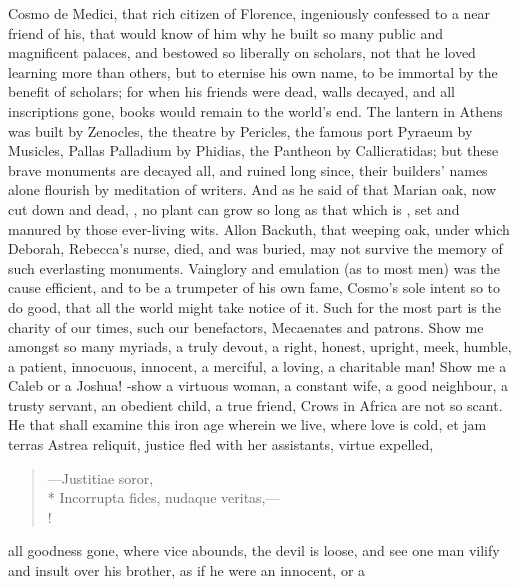 {\textlatin{Cosmo de Medici}, that rich citizen of Florence, ingeniously
confessed to a near friend of his, that would know of him why he built
so many public and magnificent palaces, and bestowed so liberally on
scholars, not that he loved learning more than others, but to
eternise his own name, to be immortal by the benefit of scholars;
for when his friends were dead, walls decayed, and all inscriptions
gone, books would remain to the world's end. The lantern in
Athens was built by Zenocles, the theatre by Pericles, the famous
port Pyraeum by Musicles, Pallas Palladium by Phidias, the Pantheon by
Callicratidas; but these brave monuments are decayed all, and ruined
long since, their builders' names alone flourish by meditation of
writers. And as he said of that Marian oak, now cut down and
dead, , no plant can grow so long as that which
is , set and manured by those ever-living wits. Allon
Backuth, that weeping oak, under which Deborah, Rebecca's nurse, died,
and was buried, may not survive the memory of such everlasting
monuments. Vainglory and emulation (as to most men) was the cause
efficient, and to be a trumpeter of his own fame, Cosmo's sole intent
so to do good, that all the world might take notice of it. Such for the
most part is the charity of our times, such our benefactors, Mecaenates
and patrons. Show me amongst so many myriads, a truly devout, a right,
honest, upright, meek, humble, a patient, innocuous, innocent, a
merciful, a loving, a charitable man! 
Show me a Caleb or a Joshua! -show a virtuous woman,
a constant wife, a good neighbour, a trusty servant, an obedient child,
a true friend, \etc{} Crows in Africa are not so scant. He that shall
examine this iron age wherein we live, where love is cold, et jam
terras Astrea reliquit, justice fled with her assistants, virtue
expelled,
%
\begin{latin}
\begin{verse}
---Justitiae soror,\\*
Incorrupta fides, nudaque veritas,---\\!
\end{verse}
\end{latin}
%
all goodness gone, where vice abounds, the devil is loose, and see one
man vilify and insult over his brother, as if he were an innocent, or a
}

